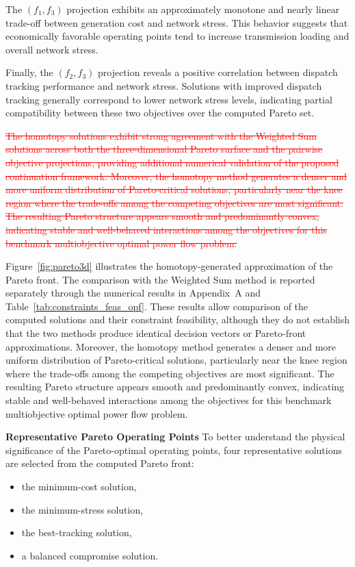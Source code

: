 \documentclass[11pt,pdflatex,sn-mathphys-ay]{sn-jnl}%
\theoremstyle{definition}
\theoremstyle{thmstyleone}%
\theoremstyle{thmstyletwo}%
\theoremstyle{thmstylethree}%
\newcommand{\del}[1]{\textcolor{red}{\sout{#1}}}
\newcommand{\add}[1]{\textcolor{revisionblue}{#1}}
\begin{document}
	The $(f_1,f_3)$ projection exhibits an approximately monotone and nearly linear trade-off between generation cost and network stress. 
	This behavior suggests that economically favorable operating points tend to increase transmission loading and overall network stress.
	
	Finally, the $(f_2,f_3)$ projection reveals a positive correlation between dispatch tracking performance and network stress. 
	Solutions with improved dispatch tracking generally correspond to lower network stress levels, indicating partial compatibility between these two objectives over the computed Pareto set.
	
	
	\del{The homotopy solutions exhibit strong agreement with the
		Weighted Sum solutions across both the three-dimensional
		Pareto surface and the pairwise objective projections,
		providing additional numerical validation of the proposed
		continuation framework. Moreover, the homotopy method
		generates a denser and more uniform distribution of
		Pareto-critical solutions, particularly near the knee
		region where the trade-offs among the competing objectives
		are most significant. The resulting Pareto structure
		appears smooth and predominantly convex, indicating
		stable and well-behaved interactions among the objectives
		for this benchmark multiobjective optimal power flow
		problem.}
	
	\add{Figure~\ref{fig:pareto3d} illustrates the
		homotopy-generated approximation of the Pareto front.
		The comparison with the Weighted Sum method is reported
		separately through the numerical results in
		Appendix~A and Table~\ref{tab:constraints_feas_opf}.
		These results allow comparison of the computed solutions
		and their constraint feasibility, although they do not
		establish that the two methods produce identical
		decision vectors or Pareto-front approximations.}
	Moreover, the homotopy method generates a denser and more uniform distribution of Pareto-critical solutions, particularly near the knee region where the trade-offs among the competing objectives are most significant. The resulting Pareto structure appears smooth and predominantly convex, indicating stable and well-behaved interactions among the objectives for this benchmark multiobjective optimal power flow problem.
	
	
	\noindent \textbf{Representative Pareto Operating Points}
	To better understand the physical significance of the Pareto-optimal operating points, four representative solutions are selected from the computed Pareto front:
	\begin{itemize}
		\item the minimum-cost solution,
		\item the minimum-stress solution,
		\item the best-tracking solution,
		\item a balanced compromise solution.
	\end{itemize}
	
\end{document}
